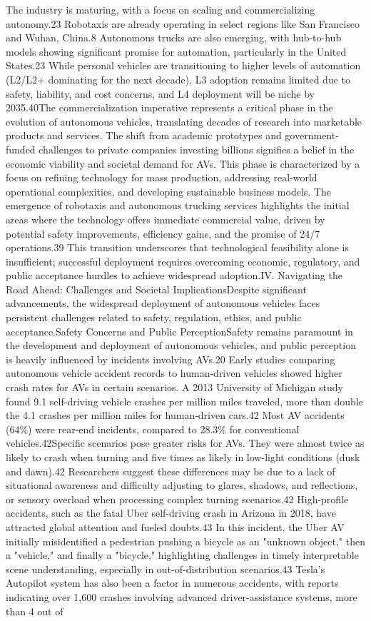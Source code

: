 The industry is maturing, with a focus on scaling and commercializing autonomy.23 Robotaxis are already operating in select regions like San Francisco and Wuhan, China.8 Autonomous trucks are also emerging, with hub-to-hub models showing significant promise for automation, particularly in the United States.23 While personal vehicles are transitioning to higher levels of automation (L2/L2+ dominating for the next decade), L3 adoption remains limited due to safety, liability, and cost concerns, and L4 deployment will be niche by 2035.40The commercialization imperative represents a critical phase in the evolution of autonomous vehicles, translating decades of research into marketable products and services. The shift from academic prototypes and government-funded challenges to private companies investing billions signifies a belief in the economic viability and societal demand for AVs. This phase is characterized by a focus on refining technology for mass production, addressing real-world operational complexities, and developing sustainable business models. The emergence of robotaxis and autonomous trucking services highlights the initial areas where the technology offers immediate commercial value, driven by potential safety improvements, efficiency gains, and the promise of 24/7 operations.39 This transition underscores that technological feasibility alone is insufficient; successful deployment requires overcoming economic, regulatory, and public acceptance hurdles to achieve widespread adoption.IV. Navigating the Road Ahead: Challenges and Societal ImplicationsDespite significant advancements, the widespread deployment of autonomous vehicles faces persistent challenges related to safety, regulation, ethics, and public acceptance.Safety Concerns and Public PerceptionSafety remains paramount in the development and deployment of autonomous vehicles, and public perception is heavily influenced by incidents involving AVs.20 Early studies comparing autonomous vehicle accident records to human-driven vehicles showed higher crash rates for AVs in certain scenarios. A 2013 University of Michigan study found 9.1 self-driving vehicle crashes per million miles traveled, more than double the 4.1 crashes per million miles for human-driven cars.42 Most AV accidents (64\%) were rear-end incidents, compared to 28.3\% for conventional vehicles.42Specific scenarios pose greater risks for AVs. They were almost twice as likely to crash when turning and five times as likely in low-light conditions (dusk and dawn).42 Researchers suggest these differences may be due to a lack of situational awareness and difficulty adjusting to glares, shadows, and reflections, or sensory overload when processing complex turning scenarios.42 High-profile accidents, such as the fatal Uber self-driving crash in Arizona in 2018, have attracted global attention and fueled doubts.43 In this incident, the Uber AV initially misidentified a pedestrian pushing a bicycle as an "unknown object," then a "vehicle," and finally a "bicycle," highlighting challenges in timely interpretable scene understanding, especially in out-of-distribution scenarios.43 Tesla's Autopilot system has also been a factor in numerous accidents, with reports indicating over 1,600 crashes involving advanced driver-assistance systems, more than 4 out of 